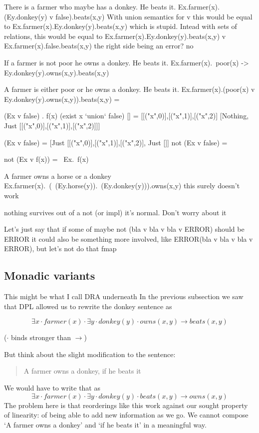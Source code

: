 \documentclass[12pt]{article}
\begin{document}
There is a farmer who maybe has a donkey. He beats it.
Ex.farmer(x).(Ey.donkey(y) v false).beats(x,y)
With union semantics for v this would be equal to
Ex.farmer(x).Ey.donkey(y).beats(x,y)
which is stupid.
Intead with sets of relations, this would be equal to
Ex.farmer(x).Ey.donkey(y).beats(x,y) v Ex.farmer(x).false.beats(x,y)
the right side being an error? no

If a farmer is not poor he owns a donkey. He beats it.
Ex.farmer(x).~poor(x) -> Ey.donkey(y).owns(x,y).beats(x,y)

A farmer is either poor or he owns a donkey. He beats it.
Ex.farmer(x).(poor(x) v Ey.donkey(y).owns(x,y)).beats(x,y) =

(Ex v false) . f(x)
(exist x `union` false) [] = [[("x",0)],[("x",1)],[("x",2)]
[Nothing, Just [[("x",0)],[("x",1)],[("x",2)]]]


(Ex v false) = [Just [[("x",0)],[("x",1)],[("x",2)], Just []]
not (Ex v false) =

not (Ex v f(x))
= ~Ex.~f(x)

A farmer owns a horse or a donkey
Ex.farmer(x).~(~(Ey.horse(y)).~(Ey.donkey(y))).owns(x,y)   this surely doesn't work


nothing survives out of a not (or impl) it's normal. Don't worry about it

Let's just say that if some of 
maybe not (bla v bla v bla v ERROR) should be ERROR
it could also be something more involved, like ERROR(bla v bla v bla v ERROR), but let's not do that
fmap

\subsection{Monadic variants}
This might be what I call DRA underneath
In the previous subsection we saw that DPL allowed us to rewrite the donkey sentence as 

\begin{equation}
\exists x \cdot farmer(x) \cdot \exists y \cdot donkey(y) \cdot owns(x,y) \rightarrow beats(x,y)
\end{equation}

($\cdot$ binds stronger than $\rightarrow$)

But think about the slight modification to the sentence:
%
\begin{quotation}
A farmer owns a donkey, if he beats it
\end{quotation}
%
We would have to write that as
%
\begin{equation}
\exists x \cdot farmer(x) \cdot \exists y \cdot donkey(y) \cdot beats(x,y) \rightarrow owns(x,y)
\end{equation}
%
The problem here is that reorderings like this work against our sought property of linearity: of being able to add new information as we go. We cannot compose `A farmer owns a donkey' and `if he beats it' in a meaningful way.
\end{document}
